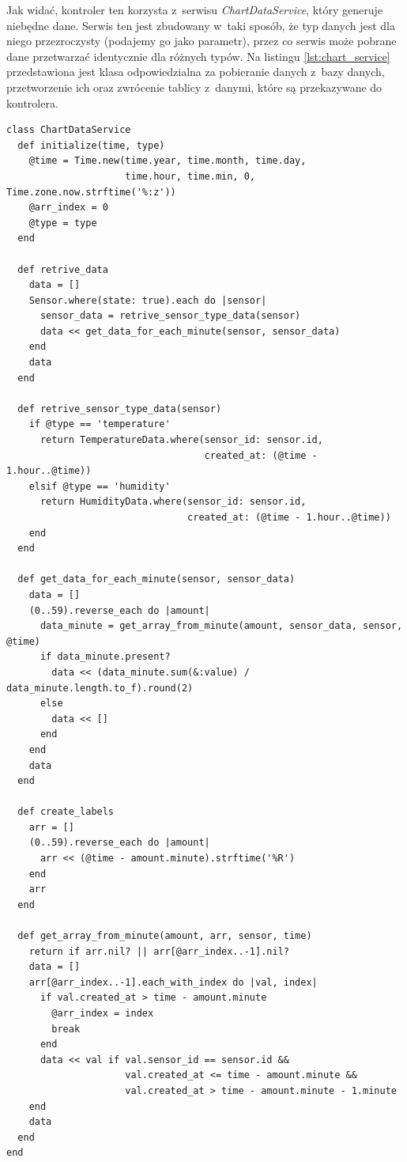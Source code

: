 \documentclass[eng,oneside]{mgr}
\begin{document}
Jak widać, kontroler ten korzysta z~serwisu \emph{ChartDataService}, który generuje niebędne dane. Serwis ten jest zbudowany w~taki sposób, że typ danych jest dla niego przezroczysty (podajemy go jako parametr), przez co serwis może pobrane dane przetwarzać identycznie dla różnych typów. Na listingu \ref{lst:chart_service} przedstawiona jest klasa odpowiedzialna za pobieranie danych z~bazy danych, przetworzenie ich oraz zwrócenie tablicy z~danymi, które są przekazywane do kontrolera.
\begin{lstlisting}[caption={Klasa ChartDataService.},label=lst:chart_service]
class ChartDataService
  def initialize(time, type)
    @time = Time.new(time.year, time.month, time.day,
                     time.hour, time.min, 0, Time.zone.now.strftime('%:z'))
    @arr_index = 0
    @type = type
  end

  def retrive_data
    data = []
    Sensor.where(state: true).each do |sensor|
      sensor_data = retrive_sensor_type_data(sensor)
      data << get_data_for_each_minute(sensor, sensor_data)
    end
    data
  end

  def retrive_sensor_type_data(sensor)
    if @type == 'temperature'
      return TemperatureData.where(sensor_id: sensor.id,
                                   created_at: (@time - 1.hour..@time))
    elsif @type == 'humidity'
      return HumidityData.where(sensor_id: sensor.id,
                                created_at: (@time - 1.hour..@time))
    end
  end

  def get_data_for_each_minute(sensor, sensor_data)
    data = []
    (0..59).reverse_each do |amount|
      data_minute = get_array_from_minute(amount, sensor_data, sensor, @time)
      if data_minute.present?
        data << (data_minute.sum(&:value) / data_minute.length.to_f).round(2)
      else
        data << []
      end
    end
    data
  end

  def create_labels
    arr = []
    (0..59).reverse_each do |amount|
      arr << (@time - amount.minute).strftime('%R')
    end
    arr
  end

  def get_array_from_minute(amount, arr, sensor, time)
    return if arr.nil? || arr[@arr_index..-1].nil?
    data = []
    arr[@arr_index..-1].each_with_index do |val, index|
      if val.created_at > time - amount.minute
        @arr_index = index
        break
      end
      data << val if val.sensor_id == sensor.id &&
                     val.created_at <= time - amount.minute &&
                     val.created_at > time - amount.minute - 1.minute
    end
    data
  end
end
\end{lstlisting}
\end{document}
